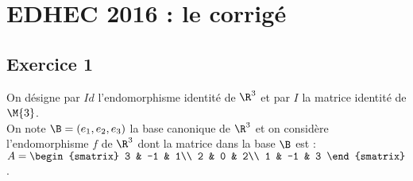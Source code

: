 \chapter*{EDHEC 2016 : le corrigé}
  
%

\section*{Exercice 1}
\noindent
On désigne par $Id$ l'endomorphisme identité de $\R^3$ et par $I$ la
matrice identité de $\M{3}$. \\
On note $\B = (e_{1},e_{2},e_{3})$ la base canonique de $\R^3$ et on
considère l'endomorphisme $f$ de $\R^3$ dont la matrice dans la base
$\B$ est : $A =
\begin{smatrix}
  3 & -1 & 1\\
  2 & 0 & 2\\
  1 & -1 & 3
\end{smatrix}
$. 
